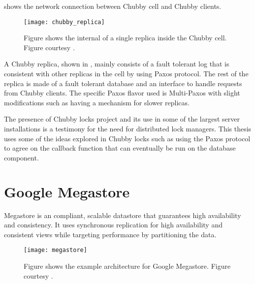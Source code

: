  shows the network connection between Chubby cell
 and Chubby clients.

\begin{figure}
  \texttt{[image: chubby\_replica]}
  \caption[Chubby Replica]{%
    Figure shows the internal of a single replica inside the Chubby cell.
    Figure courtesy \citet{ChandraGR07}.}
  \label{figure:chubby.structure}
\end{figure}

A Chubby replica, shown in , mainly consists of a
fault tolerant log that is consistent
with other replicas in the cell by using Paxos protocol. The rest of the
replica is made of a fault tolerant database and an interface to handle
requests from Chubby clients. The specific Paxos flavor used is Multi-Paxos
with slight modifications such as having a  mechanism for
slower replicas.

The presence of Chubby locks project and its use in some of the largest
server installations is a testimony for the need for distributed lock
managers. This thesis uses some of the ideas explored in Chubby locks such
as using the Paxos protocol to agree on the callback function that can
eventually be run on the database component.

\section{Google Megastore}

Megastore \citep{BakerBCFKLLLLY11} is an %
compliant, scalable datastore that guarantees high availability and
consistency. It uses synchronous replication for high availability and
consistent views while targeting performance by partitioning the data.

\begin{figure}
  \texttt{[image: megastore]}
  \caption[Google Megastore]{%
    Figure shows the example architecture for Google Megastore.
    Figure courtesy \citet{BakerBCFKLLLLY11}.}
  \label{figure:megastore}
\end{figure}

